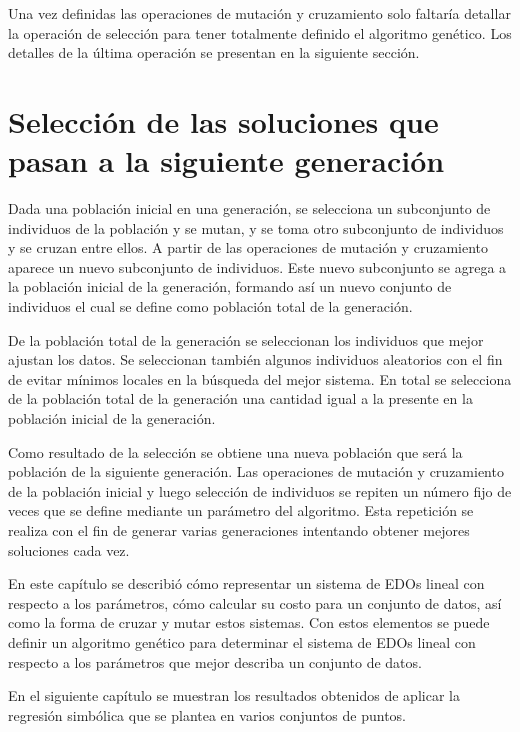 \begin{center}
\begin{adjustbox}{width=0.5\textwidth, keepaspectratio}
    \end{adjustbox}
\end{center}

Una vez definidas las operaciones de mutación y cruzamiento solo faltaría detallar la operación de selección para tener totalmente definido el algoritmo genético. Los detalles de la última operación se presentan en la siguiente sección.

\section{Selección de las soluciones que pasan a la siguiente generación}\label{section:selection}

Dada una población inicial en una generación, se selecciona un subconjunto de individuos de la población y se mutan, y se toma otro subconjunto de individuos y se cruzan entre ellos. A partir de las operaciones de mutación y cruzamiento aparece un nuevo subconjunto de individuos. Este nuevo subconjunto se agrega a la población inicial de la generación, formando así un nuevo conjunto de individuos el cual se define como población total de la generación.

De la población total de la generación se seleccionan los individuos que mejor ajustan los datos. Se seleccionan también algunos individuos aleatorios con el fin de evitar mínimos locales en la búsqueda del mejor sistema. En total se selecciona de la población total de la generación una cantidad igual a la presente en la población inicial de la generación.

Como resultado de la selección se obtiene una nueva población que será la población de la siguiente generación. Las operaciones de mutación y cruzamiento de la población inicial y luego selección de individuos se repiten un número fijo de veces que se define mediante un parámetro del algoritmo. Esta repetición se realiza con el fin de generar varias generaciones intentando obtener mejores soluciones cada vez.

En este capítulo se describió cómo representar un sistema de EDOs lineal con respecto a los parámetros, cómo calcular su costo para un conjunto de datos, así como la forma de cruzar y mutar estos sistemas. Con estos elementos se puede definir un algoritmo genético para determinar el sistema de EDOs lineal con respecto a los parámetros que mejor describa un conjunto de datos.

En el siguiente capítulo se muestran los resultados obtenidos de aplicar la regresión simbólica que se plantea en varios conjuntos de puntos.